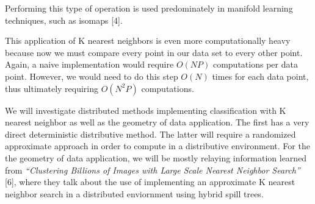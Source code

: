 \vspace{5 mm}
\noindent
Performing this type of operation is used predominately in manifold learning 
techniques, such as isomaps [4].

\vspace{5 mm}
\noindent
This application of K nearest neighbors is even more computationally heavy 
because now we must compare every point in our data set to every other point. 
Again, a naive implementation would require $O(NP)$ computations per data 
point. However, we would need to do this step $O(N)$ times for each data point, 
thus ultimately requiring $O(N^{2}P)$ computations.

\vspace{5 mm}
\noindent
We will investigate distributed methods implementing classification with 
K nearest neighbor as well as the geometry of data application. The 
first has a very direct deterministic distributive method. The latter will 
require a randomized approximate approach in order to compute in a distributive 
environment. For the the geometry of data application, we will be mostly 
relaying information learned from \textit{``Clustering Billions of Images with 
Large Scale Nearest Neighbor Search''} [6], where they talk about the use of 
implementing an approximate K nearest neighbor search in a distributed enviornment
using hybrid spill trees.
